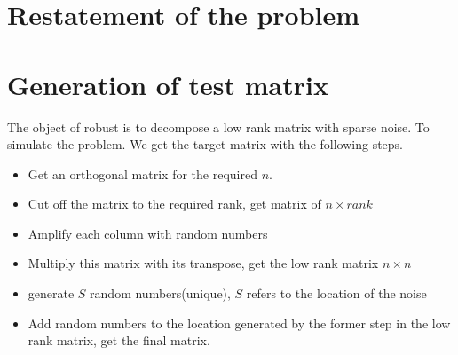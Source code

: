 \documentclass{article}
\begin{document}
\section{Restatement of the problem}
\section{Generation of test matrix}
The object of robust is to decompose a low rank matrix with sparse noise. 
To simulate the problem. We get the target matrix with the following steps.
\begin{itemize}
    \item Get an orthogonal matrix for the required $n$.
    \item Cut off the matrix to the required rank, get matrix of $n \times rank$
    \item Amplify each column with random numbers
    \item Multiply this matrix with its transpose, get the low rank matrix $n\times n$
    \item generate $S$ random numbers(unique), $S$ refers to the location of the noise
    \item Add random numbers to the location generated by the former step in the low rank matrix, get the final matrix.
\end{itemize}
\end{document}
